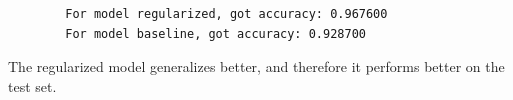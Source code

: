 \begin{answer}
    \begin{verbatim}
        For model regularized, got accuracy: 0.967600
        For model baseline, got accuracy: 0.928700
    \end{verbatim}

    The regularized model generalizes better, and therefore it performs better on the test set.
\end{answer}
   
  
